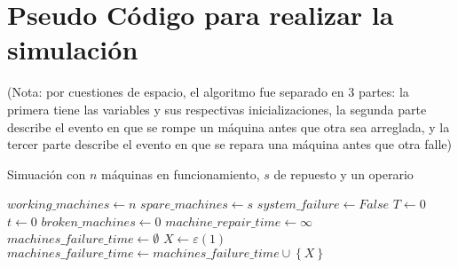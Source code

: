 \documentclass[12pt]{article}
\begin{document}
\section{Pseudo Código para realizar la simulación}

(Nota: por cuestiones de espacio, el algoritmo fue separado en 3 partes:
la primera tiene las variables y sus respectivas inicializaciones, la segunda
parte describe el evento en que se rompe un máquina antes que otra sea arreglada, y
la tercer parte describe el evento en que se repara una máquina antes que otra falle)	 

\begin{algorithm}
\caption{Simuación con $n$ máquinas en funcionamiento, $s$ de repuesto y un operario}
\begin{algorithmic}[1]
\State $working\_machines \gets n$
\State $spare\_machines \gets s$
\State $system\_failure \gets False$
\State $T \gets 0$
\State $t \gets 0$
\State $broken\_machines \gets 0$
\State $machine\_repair\_time \gets \infty$
\State $machines\_failure\_time \gets \emptyset$
  \State $X \gets \varepsilon(1)$
  \State $machines\_failure\_time \gets machines\_failure\_time \cup \left\{ X \right\} $
\EndFor
\end{algorithmic}
\end{algorithm}
\clearpage
\end{document}
